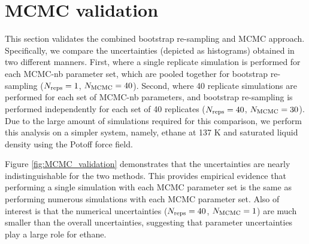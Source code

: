 \documentclass[preprint,review,11pt]{elsarticle}
\begin{document}
    
%	
%	
%	
%	
    \clearpage
    \newpage

	\section{MCMC validation} \label{SI:MCMC_analysis}
	
	This section validates the combined bootstrap re-sampling and MCMC approach. Specifically, we compare the uncertainties (depicted as histograms) obtained in two different manners. First, where a single replicate simulation is performed for each MCMC-nb parameter set, which are pooled together for bootstrap re-sampling ($N_{\rm reps} = 1$, $N_{\rm MCMC} = 40$). Second, where 40 replicate simulations are performed for each set of MCMC-nb parameters, and bootstrap re-sampling is performed independently for each set of 40 replicates ($N_{\rm reps} = 40$, $N_{\rm MCMC} = 30$). Due to the large amount of simulations required for this comparison, we perform this analysis on a simpler system, namely, ethane at 137 K and saturated liquid density using the Potoff force field. 
	
	Figure \ref{fig:MCMC_validation} demonstrates that the uncertainties are nearly indistinguishable for the two methods. This provides empirical evidence that performing a single simulation with each MCMC parameter set is the same as performing numerous simulations with each MCMC parameter set. Also of interest is that the numerical uncertainties ($N_{\rm reps} = 40$, $N_{\rm MCMC} = 1$) are much smaller than the overall uncertainties, suggesting that parameter uncertainties play a large role for ethane.
	
\end{document}
